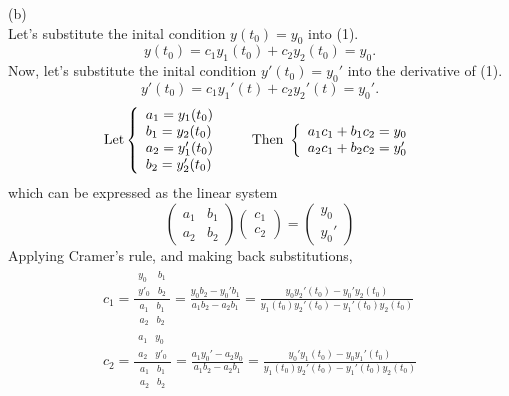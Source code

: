 \documentclass[a4paper, 11pt]{report}
\begin{document}
\sol (b) \\
Let's substitute the inital condition $y(t_0) = y_0$ into (1).
$$
  y(t_0) = c_1y_1(t_0) + c_2y_2(t_0) = y_0.
$$
Now, let's substitute the inital condition $y'(t_0) = y_0'$ into the derivative of (1).
$$
  y'(t_0) = c_1y_1'(t) + c_2y_2'(t) = y_0'.
$$
$$
  \text{Let}\left\lbrace \begin{array}{l} a_1 = y_1(t_0) \\ b_1 = y_2(t_0) \\ a_2 = y_1'(t_0) \\ b_2 = y_2'(t_0) \end{array} \right.\qquad\text{Then }\left\lbrace \begin{array}{l} a_1c_1 + b_1c_2 = y_0 \\ a_2c_1 + b_2c_2 = y_0' \end{array} \right.
$$
which can be expressed as the linear system
$$
  \begin{pmatrix} a_1 & b_1 \\ a_2 & b_2 \end{pmatrix} \begin{pmatrix} c_1 \\ c_2 \end{pmatrix} = \begin{pmatrix} y_0 \\ y_0' \end{pmatrix}
$$
Applying Cramer's rule, and making back substitutions,
\begin{gather*}
  c_1 = \frac{\begin{array}{|cc|} y_0 & b_1 \\ y'_0 & b_2 \end{array}}{\begin{array}{|cc|} a_1 & b_1 \\ a_2 & b_2\end{array}} 
    = \frac{y_0b_2 - y_0'b_1}{a_1b_2 - a_2b_1} 
    = \frac{y_0y_2'(t_0) - y_0'y_2(t_0)}{y_1(t_0)y_2'(t_0) - y_1'(t_0)y_2(t_0)} \\
  c_2 = \frac{\begin{array}{|cc|} a_1 & y_0\\ a_2 & y'_0 \end{array}}{\begin{array}{|cc|} a_1 & b_1 \\ a_2 & b_2\end{array}}
    = \frac{a_1y_0' - a_2y_0}{a_1b_2 - a_2b_1}
    = \frac{y_0'y_1(t_0) - y_0y_1'(t_0)}{y_1(t_0)y_2'(t_0) - y_1'(t_0)y_2(t_0)}
\end{gather*}
\end{document}
